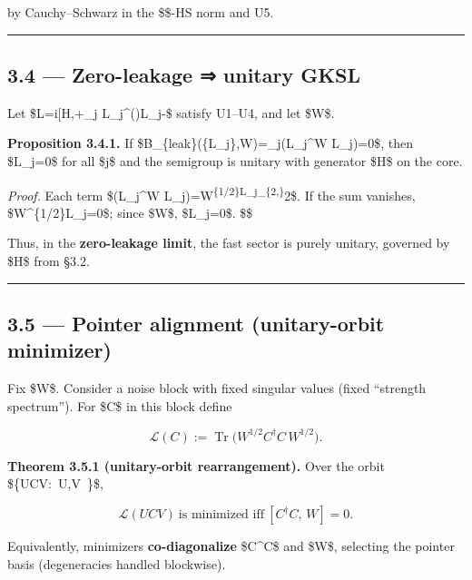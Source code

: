 \documentclass[
]{article}
\numberwithin{equation}{section}
\begin{document}
by Cauchy--Schwarz in the \$\omega\$-HS norm and U5.

\begin{center}\rule{0.5\linewidth}{0.5pt}\end{center}

\hypertarget{zero-leakage-unitary-gksl}{%
\subsection{3.4 --- Zero-leakage ⇒ unitary
GKSL}\label{zero-leakage-unitary-gksl}}

Let \$\mathcal L=i{[}H,\cdot{]}+\sum\_j
L\_j\^{}\dagger(\cdot)L\_j-\$ satisfy
U1--U4, and let \$W\$.

\textbf{Proposition 3.4.1.} If
\$\mathcal B\_\{\rm leak\}(\{L\_j\},W)=\sum\_j\omega(L\_j\^{}\dagger W
L\_j)=0\$, then \$L\_j=0\$ for all \$j\$ and the semigroup is unitary
with generator \$H\$ on the core.

\emph{Proof.} Each term \$\omega(L\_j\^{}\dagger W
L\_j)=\textbar W\textsuperscript{\{1/2\}L\_j\textbar\_\{2,\omega\}}2\$.
If the sum vanishes, \$W\^{}\{1/2\}L\_j=0\$; since \$W\$,
\$L\_j=0\$. \$\square\$

Thus, in the \textbf{zero-leakage limit}, the fast sector is purely
unitary, governed by \$H\$ from §3.2.

\begin{center}\rule{0.5\linewidth}{0.5pt}\end{center}

\hypertarget{pointer-alignment-unitary-orbit-minimizer}{%
\subsection{3.5 --- Pointer alignment (unitary-orbit
minimizer)}\label{pointer-alignment-unitary-orbit-minimizer}}

Fix \$W\$. Consider a noise block with fixed singular values
(fixed ``strength spectrum''). For \$C\$ in this block define

\[
\mathcal L(C):=\operatorname{Tr}\!\big(W^{1/2}C^\dagger C\,W^{1/2}\big).
\]

\textbf{Theorem 3.5.1 (unitary-orbit rearrangement).} Over the orbit
\$\{UCV:~U,V~\}\$,

\[
\boxed{\ \mathcal L(UCV)\ \text{is minimized iff}\ [C^\dagger C,\,W]=0.\ }
\]

Equivalently, minimizers \textbf{co-diagonalize} \$C\^{}\dagger C\$ and
\$W\$, selecting the pointer basis (degeneracies handled blockwise).
\end{document}
